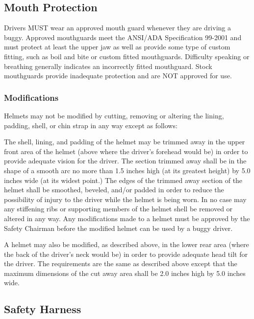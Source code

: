 \subsection{Mouth Protection}
	
	Drivers MUST wear an approved mouth guard whenever they are driving a buggy. 
	Approved mouthguards meet the ANSI/ADA Specification 99-2001 and must protect at 
	least the upper jaw as well as provide some type of custom fitting, such as boil 
	and bite or custom fitted mouthguards. Difficulty speaking or breathing generally 
	indicates an incorrectly fitted mouthguard. Stock mouthguards provide inadequate 
	protection and are NOT approved for use.

\subsubsection{Modifications}
	
	Helmets may not be modified by cutting, removing or altering the lining,
	padding, shell, or chin strap in any way except as follows:
	\newline

	The shell, lining, and padding of the helmet may be trimmed away in the upper
	front area of the helmet (above where the driver's forehead would be) in order
	to provide adequate vision for the driver. The section trimmed away shall be in
	the shape of a smooth arc no more than 1.5 inches high (at its greatest height)
	by 5.0 inches wide (at its widest point.) The edges of the trimmed away section
	of the helmet shall be smoothed, beveled, and/or padded in order to reduce the
	possibility of injury to the driver while the helmet is being worn. In no case
	may any stiffening ribs or supporting members of the helmet shell be removed or
	altered in any way. Any modifications made to a helmet must be approved by the
	Safety Chairman before the modified helmet can be used by a buggy driver.

	A helmet may also be modified, as described above, in the lower rear area
	(where the back of the driver's neck would be) in order to provide adequate
	head tilt for the driver. The requirements are the same as described above
	except that the maximum dimensions of the cut away area shall be 2.0 inches
	high by 5.0 inches wide.

\subsection{Safety Harness}

